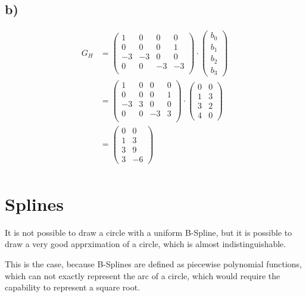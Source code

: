 \documentclass[a4paper]{scrartcl}
\begin{document}
  \subsection*{b)}
    \begin{align*}
      G_H
      &= \begin{pmatrix}
        1 & 0 & 0 & 0\\
        0 & 0 & 0 & 1\\
        -3 & -3 & 0 & 0\\
        0 & 0 & -3 & -3\\
      \end{pmatrix}
      \cdot \begin{pmatrix}
        b_0\\b_1\\b_2\\b_3
      \end{pmatrix}\\
      &= \begin{pmatrix}
        1 & 0 & 0 & 0\\
        0 & 0 & 0 & 1\\
        -3 & 3 & 0 & 0\\
        0 & 0 & -3 & 3\\
      \end{pmatrix}
      \cdot \begin{pmatrix}
        0 & 0 \\ 1 & 3 \\ 3 & 2\\ 4 & 0
      \end{pmatrix}\\
      &=\begin{pmatrix}
        0 & 0 \\ 1 & 3 \\ 3 & 9 \\ 3 & -6
      \end{pmatrix}\\
    \end{align*}

\section{Splines}
  It is not possible to draw a circle with a uniform B-Spline, but it is
  possible to draw a very good apprximation of a circle, which is almost
  indistinguishable.

  This is the case, because B-Splines are defined as piecewise polynomial
  functions, which can not exactly represent the arc of a circle, which would
  require the capability to represent a square root. 
\end{document}
